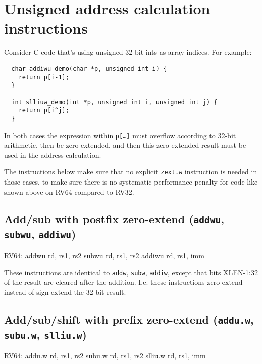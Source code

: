 
\section{Unsigned address calculation instructions}

Consider C code that's using unsigned 32-bit ints as array indices. For example:

\begin{minipage}{\linewidth}
\begin{verbatim}
  char addiwu_demo(char *p, unsigned int i) {
    return p[i-1];
  }

  int slliuw_demo(int *p, unsigned int i, unsigned int j) {
    return p[i^j];
  }
\end{verbatim}
\end{minipage}

In both cases the expression within {\tt p[\dots]} must overflow according to
32-bit arithmetic, then be zero-extended, and then this zero-extended result
must be used in the address calculation.

The instructions below make sure that no explicit {\tt zext.w} instruction
is needed in those cases, to make sure there is no systematic performance
penalty for code like shown above on RV64 compared to RV32.

\subsection{Add/sub with postfix zero-extend ({\tt addwu}, {\tt subwu}, {\tt addiwu})}

\begin{rvb}
  RV64:
    addwu rd, rs1, rs2
    subwu rd, rs1, rs2
    addiwu rd, rs1, imm
\end{rvb}

These instructions are identical to {\tt addw}, {\tt subw}, {\tt addiw},
except that bits XLEN-1:32 of the result are cleared after the addition. I.e.
these instructions zero-extend instead of sign-extend the 32-bit result.



\subsection{Add/sub/shift with prefix zero-extend ({\tt addu.w}, {\tt subu.w}, {\tt slliu.w})}

\begin{rvb}
  RV64:
    addu.w rd, rs1, rs2
    subu.w rd, rs1, rs2
    slliu.w rd, rs1, imm
\end{rvb}

